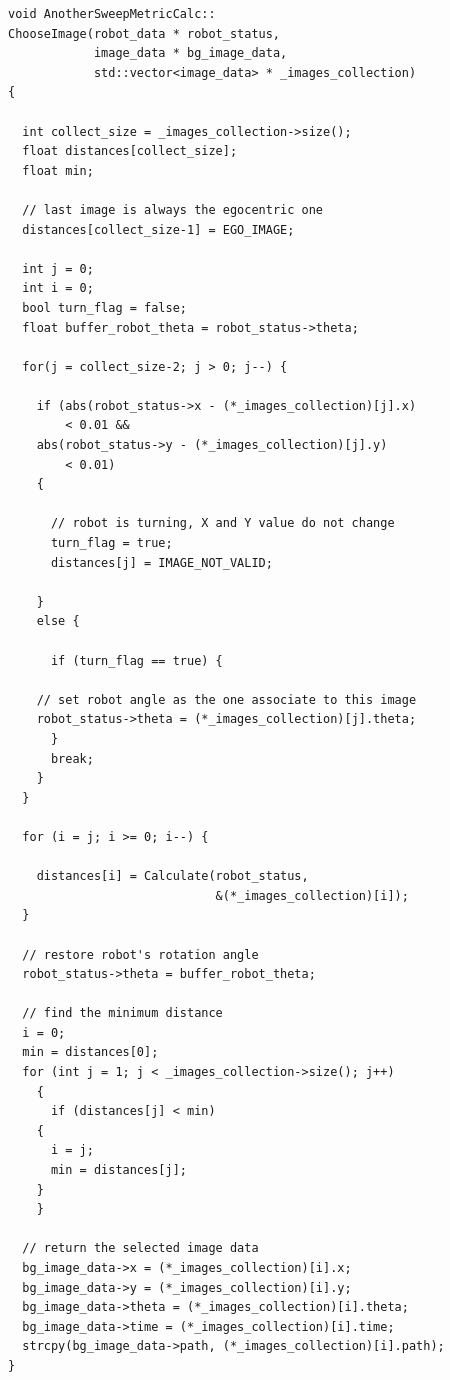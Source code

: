 \begin{lstlisting}[caption={\texttt{AnotherSweepMetricCalc::ChooseImage} method},
    label={code:anothersweepmetriccalc:chooseimage}]
void AnotherSweepMetricCalc::
ChooseImage(robot_data * robot_status,
            image_data * bg_image_data,
            std::vector<image_data> * _images_collection)
{

  int collect_size = _images_collection->size(); 
  float distances[collect_size];
  float min;

  // last image is always the egocentric one
  distances[collect_size-1] = EGO_IMAGE;

  int j = 0;
  int i = 0;
  bool turn_flag = false;
  float buffer_robot_theta = robot_status->theta;

  for(j = collect_size-2; j > 0; j--) {

    if (abs(robot_status->x - (*_images_collection)[j].x)
        < 0.01 &&
	abs(robot_status->y - (*_images_collection)[j].y)
        < 0.01)
    {
      
      // robot is turning, X and Y value do not change
      turn_flag = true;
      distances[j] = IMAGE_NOT_VALID;

    }
    else {

      if (turn_flag == true) {

	// set robot angle as the one associate to this image
	robot_status->theta = (*_images_collection)[j].theta;
      }
      break;
    }
  }

  for (i = j; i >= 0; i--) {

    distances[i] = Calculate(robot_status,
                             &(*_images_collection)[i]);
  }

  // restore robot's rotation angle
  robot_status->theta = buffer_robot_theta;
      
  // find the minimum distance
  i = 0;
  min = distances[0];
  for (int j = 1; j < _images_collection->size(); j++)
    {
      if (distances[j] < min)
	{
	  i = j;
	  min = distances[j];
	}
    }

  // return the selected image data
  bg_image_data->x = (*_images_collection)[i].x;
  bg_image_data->y = (*_images_collection)[i].y;
  bg_image_data->theta = (*_images_collection)[i].theta;
  bg_image_data->time = (*_images_collection)[i].time;
  strcpy(bg_image_data->path, (*_images_collection)[i].path);
}
\end{lstlisting}

